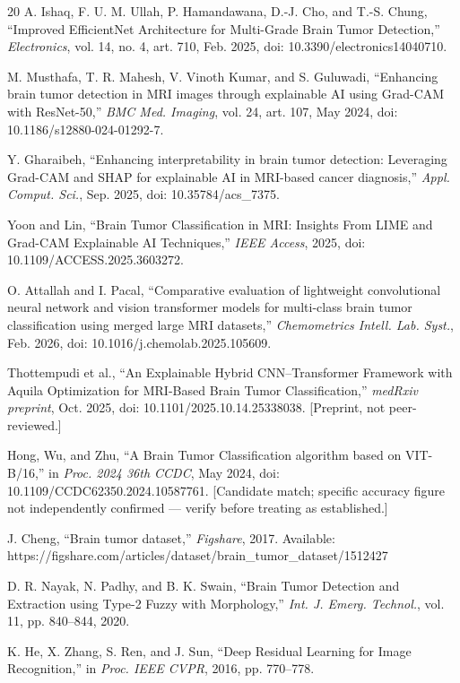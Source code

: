 \documentclass[journal]{IEEEtran}
\begin{document}
\begin{thebibliography}{20}
 A. Ishaq, F. U. M. Ullah, P. Hamandawana, D.-J. Cho, and T.-S. Chung, ``Improved EfficientNet Architecture for Multi-Grade Brain Tumor Detection,'' \emph{Electronics}, vol. 14, no. 4, art. 710, Feb. 2025, doi: 10.3390/electronics14040710.

 M. Musthafa, T. R. Mahesh, V. Vinoth Kumar, and S. Guluwadi, ``Enhancing brain tumor detection in MRI images through explainable AI using Grad-CAM with ResNet-50,'' \emph{BMC Med. Imaging}, vol. 24, art. 107, May 2024, doi: 10.1186/s12880-024-01292-7.

 Y. Gharaibeh, ``Enhancing interpretability in brain tumor detection: Leveraging Grad-CAM and SHAP for explainable AI in MRI-based cancer diagnosis,'' \emph{Appl. Comput. Sci.}, Sep. 2025, doi: 10.35784/acs\_7375.

 Yoon and Lin, ``Brain Tumor Classification in MRI: Insights From LIME and Grad-CAM Explainable AI Techniques,'' \emph{IEEE Access}, 2025, doi: 10.1109/ACCESS.2025.3603272.

 O. Attallah and I. Pacal, ``Comparative evaluation of lightweight convolutional neural network and vision transformer models for multi-class brain tumor classification using merged large MRI datasets,'' \emph{Chemometrics Intell. Lab. Syst.}, Feb. 2026, doi: 10.1016/j.chemolab.2025.105609.

 Thottempudi et al., ``An Explainable Hybrid CNN--Transformer Framework with Aquila Optimization for MRI-Based Brain Tumor Classification,'' \emph{medRxiv preprint}, Oct. 2025, doi: 10.1101/2025.10.14.25338038. [Preprint, not peer-reviewed.]

 Hong, Wu, and Zhu, ``A Brain Tumor Classification algorithm based on VIT-B/16,'' in \emph{Proc. 2024 36th CCDC}, May 2024, doi: 10.1109/CCDC62350.2024.10587761. [Candidate match; specific accuracy figure not independently confirmed --- verify before treating as established.]

 J. Cheng, ``Brain tumor dataset,'' \emph{Figshare}, 2017. Available: https://figshare.com/articles/dataset/brain\_tumor\_dataset/1512427

 D. R. Nayak, N. Padhy, and B. K. Swain, ``Brain Tumor Detection and Extraction using Type-2 Fuzzy with Morphology,'' \emph{Int. J. Emerg. Technol.}, vol. 11, pp. 840--844, 2020.

 K. He, X. Zhang, S. Ren, and J. Sun, ``Deep Residual Learning for Image Recognition,'' in \emph{Proc. IEEE CVPR}, 2016, pp. 770--778.

\end{thebibliography}
\end{document}
